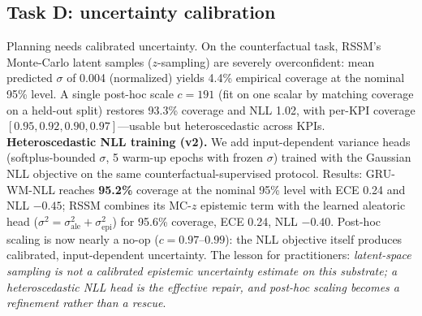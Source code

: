 \documentclass[10pt,conference]{IEEEtran}
\begin{document}
\subsection{Task D: uncertainty calibration}
Planning needs calibrated uncertainty.
On the counterfactual task, RSSM's Monte-Carlo latent samples ($z$-sampling) are severely overconfident: mean predicted $\sigma$ of 0.004 (normalized) yields 4.4\% empirical coverage at the nominal 95\% level.
A single post-hoc scale $c=191$ (fit on one scalar by matching coverage on a held-out split) restores 93.3\% coverage and NLL 1.02, with per-KPI coverage $[0.95, 0.92, 0.90, 0.97]$---usable but heteroscedastic across KPIs.
\textbf{Heteroscedastic NLL training (v2).}
We add input-dependent variance heads (softplus-bounded $\sigma$, 5 warm-up epochs with frozen $\sigma$) trained with the Gaussian NLL objective on the same counterfactual-supervised protocol.
Results: GRU-WM-NLL reaches \textbf{95.2\%} coverage at the nominal 95\% level with ECE 0.24 and NLL $-0.45$; RSSM combines its MC-$z$ epistemic term with the learned aleatoric head ($\sigma^2=\sigma^2_{\text{ale}}+\sigma^2_{\text{epi}}$) for 95.6\% coverage, ECE 0.24, NLL $-0.40$.
Post-hoc scaling is now nearly a no-op ($c\!=\!0.97$--$0.99$): the NLL objective itself produces calibrated, input-dependent uncertainty.
The lesson for practitioners: \emph{latent-space sampling is not a calibrated epistemic uncertainty estimate on this substrate; a heteroscedastic NLL head is the effective repair, and post-hoc scaling becomes a refinement rather than a rescue}.
\end{document}
